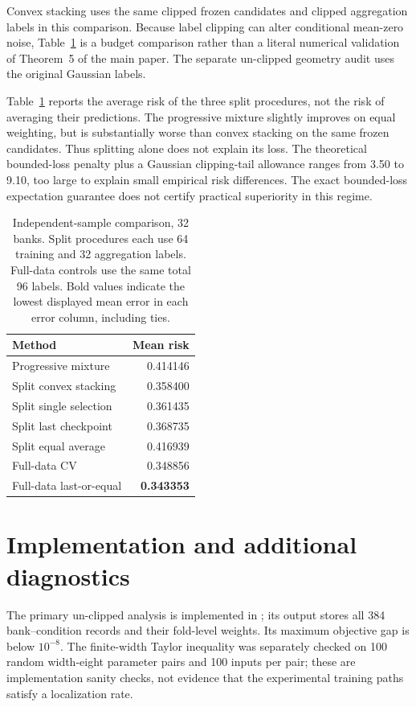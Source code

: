 \documentclass[pdflatex,sn-mathphys-ay]{sn-jnl}
\theoremstyle{remark}\newtheorem{remark}[theorem]{Remark}
\begin{document}
Convex stacking uses the same clipped frozen candidates and clipped aggregation labels in this comparison. Because label clipping can alter conditional mean-zero noise, Table~\ref{tab:split} is a budget comparison rather than a literal numerical validation of Theorem~5 of the main paper. The separate un-clipped geometry audit uses the original Gaussian labels.

Table~\ref{tab:split} reports the average risk of the three split procedures, not the risk of averaging their predictions. The progressive mixture slightly improves on equal weighting, but is substantially worse than convex stacking on the same frozen candidates. Thus splitting alone does not explain its loss. The theoretical bounded-loss penalty plus a Gaussian clipping-tail allowance ranges from 3.50 to 9.10, too large to explain small empirical risk differences. The exact bounded-loss expectation guarantee does not certify practical superiority in this regime.

\begin{table}[t]\centering\small
\caption{Independent-sample comparison, 32 banks. Split procedures each use 64 training and 32 aggregation labels. Full-data controls use the same total 96 labels. Bold values indicate the lowest displayed mean error in each error column, including ties.}\label{tab:split}
\begin{tabular}{lr}\toprule Method & Mean risk\\\midrule
Progressive mixture & 0.414146\\
Split convex stacking & 0.358400\\
Split single selection & 0.361435\\
Split last checkpoint & 0.368735\\
Split equal average & 0.416939\\
Full-data CV & 0.348856\\
Full-data last-or-equal & \textbf{0.343353}\\\bottomrule
\end{tabular}\end{table}


\section{Implementation and additional diagnostics}
The primary un-clipped analysis is implemented in ; its output stores all 384 bank--condition records and their fold-level weights. Its maximum objective gap is below $10^{-8}$. The finite-width Taylor inequality was separately checked on 100 random width-eight parameter pairs and 100 inputs per pair; these are implementation sanity checks, not evidence that the experimental training paths satisfy a localization rate.
\end{document}
